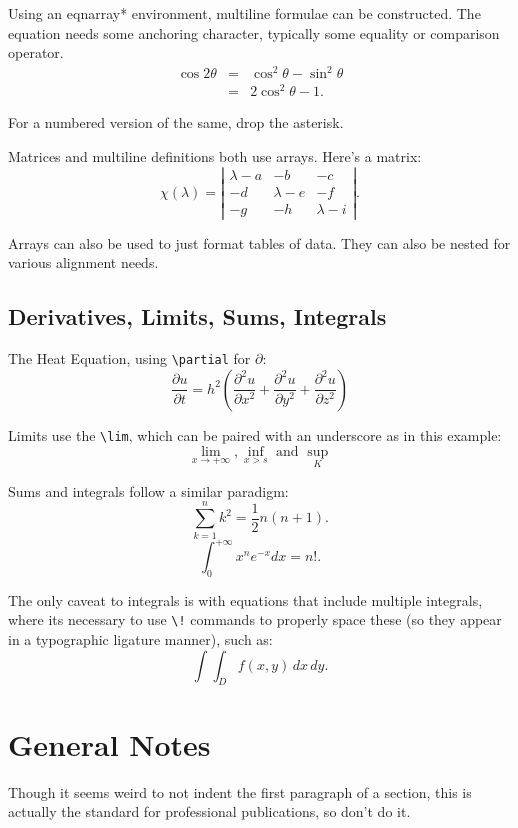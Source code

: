 \documentclass[a4paper,12pt]{article}
\begin{document}
Using an eqnarray* environment, multiline formulae can be constructed.  The
equation needs some anchoring character, typically some equality or comparison
operator.
\begin{eqnarray*}
  \cos 2\theta & = & \cos^2 \theta - \sin^2 \theta \\
  & = & 2 \cos^2 \theta - 1.
\end{eqnarray*}

For a numbered version of the same, drop the asterisk.

Matrices and multiline definitions both use arrays.  Here's a matrix: 
\[ \chi(\lambda) = \left| \begin{array}{ccc}
\lambda - a & -b & -c \\
-d & \lambda - e & -f \\
-g & -h & \lambda - i \end{array} \right|.\] 

Arrays can also be used to just format tables of data.  They can also be nested
for various alignment needs. 

\subsection{Derivatives, Limits, Sums, Integrals}

The Heat Equation, using \texttt{\textbackslash partial} for $\partial$:
\[ \frac{\partial u}{\partial t}
   = h^2 \left( \frac{\partial^2 u}{\partial x^2}
      + \frac{\partial^2 u}{\partial y^2}
      + \frac{\partial^2 u}{\partial z^2} \right) \]

Limits use the \texttt{\textbackslash lim}, which can be paired with an
underscore as in this example:
\[ \lim_{x \to +\infty}, \inf_{x > s} \mbox{ and } \sup_{K} \]

Sums and integrals follow a similar paradigm:
\[ \sum_{k = 1}^{n} k^2 = \frac{1}{2} n (n + 1). \]
\[ \int_{0}^{+\infty} x^n e^{-x} dx = n!. \]

The only caveat to integrals is with equations that include multiple integrals,
where its necessary to use \texttt{\textbackslash !} commands to properly space
these (so they appear in a typographic ligature manner), such as:
\[ \int \!\!\! \int_D f(x,y)\,dx\,dy.\]

\section{General Notes}

Though it seems weird to not indent the first paragraph of a section, this is
actually the standard for professional publications, so don't do it.
\end{document}
